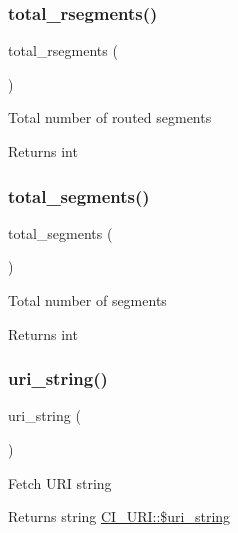 \subsubsection{\texorpdfstring{total\+\_\+rsegments()}{total\_rsegments()}}
{\footnotesize\ttfamily total\+\_\+rsegments (\begin{DoxyParamCaption}{ }\end{DoxyParamCaption})}

Total number of routed segments

\begin{DoxyReturn}{Returns}
int 
\end{DoxyReturn}
\mbox{\label{class_c_i___u_r_i_a5805c40e1c916e7b00b49f131765ac1c}} 
\subsubsection{\texorpdfstring{total\+\_\+segments()}{total\_segments()}}
{\footnotesize\ttfamily total\+\_\+segments (\begin{DoxyParamCaption}{ }\end{DoxyParamCaption})}

Total number of segments

\begin{DoxyReturn}{Returns}
int 
\end{DoxyReturn}
\mbox{\label{class_c_i___u_r_i_ac7a3f945c14cc37f89b6d9d1c7a037a4}} 
\subsubsection{\texorpdfstring{uri\+\_\+string()}{uri\_string()}}
{\footnotesize\ttfamily uri\+\_\+string (\begin{DoxyParamCaption}{ }\end{DoxyParamCaption})}

Fetch U\+RI string

\begin{DoxyReturn}{Returns}
string \mbox{\hyperlink{class_c_i___u_r_i_ab908b3e655463a05e8a646c965ca4e53}{C\+I\+\_\+\+U\+R\+I\+::\$uri\+\_\+string}} 
\end{DoxyReturn}
\mbox{\label{class_c_i___u_r_i_a67cca74de71898ee88c167a265cff140}} 
